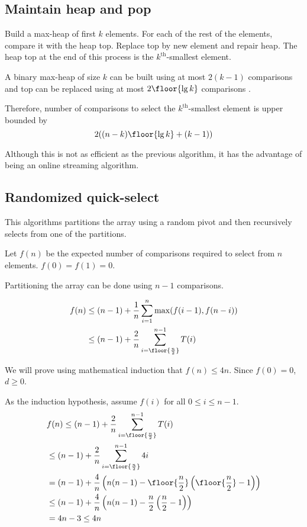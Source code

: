 \subsection{Maintain heap and pop}

Build a max-heap of first $k$ elements.
For each of the rest of the elements, compare it with the heap top.
Replace top by new element and repair heap.
The heap top at the end of this process is the $k^{\textrm{th}}$-smallest element.

A binary max-heap of size $k$ can be built using at most $2(k-1)$ comparisons and top can be replaced
using at most $2\floor{\lg k}$ comparisons \cite{eku-notes-heaps}.

Therefore, number of comparisons to select the $k^{\textrm{th}}$-smallest element is upper bounded by
\[ 2((n-k)\floor{\lg k} + (k-1)) \]

Although this is not as efficient as the previous algorithm,
it has the advantage of being an online streaming algorithm.

\subsection{Randomized quick-select}

This algorithms partitions the array using a random pivot
and then recursively selects from one of the partitions.

Let $f(n)$ be the expected number of comparisons required to select from $n$ elements.
$f(0) = f(1) = 0$.

Partitioning the array can be done using $n-1$ comparisons.

\begin{align*}
f(n) &\le (n-1) + \frac{1}{n} \sum_{i=1}^n \max(f(i-1), f(n-i))
\\ &\le (n-1) + \frac{2}{n} \sum_{i=\floor{\frac{n}{2}}}^{n-1} T(i)
\end{align*}

We will prove using mathematical induction that $f(n) \le 4n$.
Since $f(0) = 0$, $d \ge 0$.

As the induction hypothesis, assume $f(i)$ for all $0 \le i \le n-1$.
\begin{align*}
& f(n) \le (n-1) + \frac{2}{n} \sum_{i=\floor{\frac{n}{2}}}^{n-1} T(i)
\\ &\le (n-1) + \frac{2}{n} \sum_{i=\floor{\frac{n}{2}}}^{n-1} 4i
\\ &= (n-1) + \frac{4}{n} \left( n(n-1) -
\floor{\frac{n}{2}}\left(\floor{\frac{n}{2}}-1\right) \right)
\\ &\le (n-1) + \frac{4}{n} \left( n(n-1) -
\frac{n}{2}\left(\frac{n}{2}-1\right) \right)
\\ &= 4n - 3 \le 4n
\end{align*}

